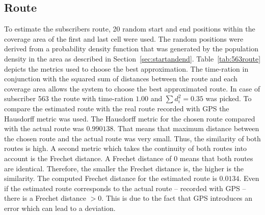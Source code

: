 \subsection{Route}
To estimate the subscribers route, 20 random start and end positions within the coverage area of the first and last cell were used. The random positions were derived from a probability density function that was generated by the population density in the area as described in Section~\ref{sec:startandend}. Table~\ref{tab:563route} depicts the metrics used to choose the best approximation. The time-ration in conjunction with the squared sum of distances between the route and each coverage area allows the system to choose the best approximated route. In case of subscriber 563 the route with time-ration $1.00$ and $\sum {d}_{i}^{2}=0.35$ was picked. To compare the estimated route with the real route recorded with GPS the Hausdorff metric was used. The Hausdorff metric for the chosen route  compared with the actual route was $0.990138 $. That means that maximum distance between the chosen route and the actual route was very small. Thus, the similarity of  both routes is high. A second metric which takes the continuity of both routes into account is the Frechet distance. A Frechet distance of $0$ means that both routes are identical. Therefore, the smaller the Frechet distance is, the higher is the similarity. The computed Frechet distance for the estimated route is $0.0134$. Even if the estimated route corresponds to the actual route -- recorded with GPS -- there is a Frechet distance $>0$. This is due to the fact that GPS introduces an error which can lead to a deviation.


